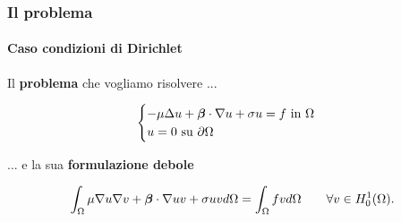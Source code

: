 \begin{frame}
 \frametitle{Il problema}
 \framesubtitle{Caso condizioni di Dirichlet}
 Il \textbf{problema} che vogliamo risolvere ...
 \begin{exampleblock}{}
 \begin{equation}
  \begin{cases}
   -\mu\Delta u + \boldsymbol{\beta}\cdot \nabla u +\sigma u = f\text{ in }\Omega\\
   u=0\text{ su }\partial{\Omega}
  \end{cases}
 \end{equation}
 \end{exampleblock}
 ... e la sua \textbf{formulazione debole}
 \begin{exampleblock}{}
 \begin{equation}
  \int_{\Omega} \mu\nabla u \nabla v +\boldsymbol{\beta}\cdot \nabla uv + \sigma uv d\Omega=\int_{\Omega}fv d\Omega\qquad\forall v \in H^1_0(\Omega).
 \end{equation}
 \end{exampleblock}


\end{frame}

